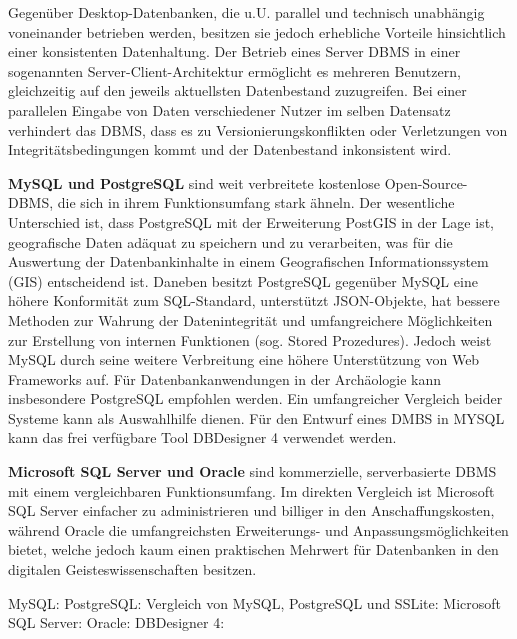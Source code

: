 Gegenüber Desktop-Datenbanken, die u.U. parallel und technisch unabhängig voneinander betrieben werden, besitzen sie jedoch erhebliche Vorteile hinsichtlich einer konsistenten Datenhaltung. Der Betrieb eines Server DBMS in einer sogenannten Server-Client-Architektur ermöglicht es mehreren Benutzern, gleichzeitig auf den jeweils aktuellsten Datenbestand zuzugreifen. Bei einer parallelen Eingabe von Daten verschiedener Nutzer im selben Datensatz verhindert das DBMS, dass es zu Versionierungskonflikten oder Verletzungen von Integritätsbedingungen kommt und der Datenbestand inkonsistent wird.

{\bfseries MySQL und PostgreSQL} sind weit verbreitete kostenlose Open-Source-DBMS, die sich in ihrem Funktionsumfang stark ähneln. Der wesentliche Unterschied ist, dass PostgreSQL mit der Erweiterung PostGIS in der Lage ist, geografische Daten adäquat zu speichern und zu verarbeiten, was für die Auswertung der Datenbankinhalte in einem Geografischen Informationssystem (GIS) entscheidend ist. Daneben besitzt PostgreSQL gegenüber MySQL eine höhere Konformität zum SQL-Standard, unterstützt JSON-Objekte, hat bessere Methoden zur Wahrung der Datenintegrität und umfangreichere Möglichkeiten zur Erstellung von internen Funktionen (sog. Stored Prozedures). Jedoch weist MySQL durch seine weitere Verbreitung eine höhere Unterstützung von Web Frameworks auf. Für Datenbankanwendungen in der Archäologie kann insbesondere PostgreSQL empfohlen werden. Ein umfangreicher Vergleich beider Systeme kann als Auswahlhilfe dienen. Für den Entwurf eines DMBS in MYSQL kann das frei verfügbare Tool DBDesigner 4 verwendet werden. 

{\bfseries Microsoft SQL Server und Oracle} sind kommerzielle, serverbasierte DBMS mit einem vergleichbaren Funktionsumfang. Im direkten Vergleich ist Microsoft SQL Server einfacher zu administrieren und billiger in den Anschaffungskosten, während Oracle die umfangreichsten Erweiterungs- und Anpassungsmöglichkeiten bietet, welche jedoch kaum einen praktischen Mehrwert für Datenbanken in den digitalen Geisteswissenschaften besitzen.

\begin{flushleft}
MySQL: 
PostgreSQL: 
Vergleich von MySQL, PostgreSQL und SSLite: 
Microsoft SQL Server: 
Oracle: 
DBDesigner 4: 
\end{flushleft}


